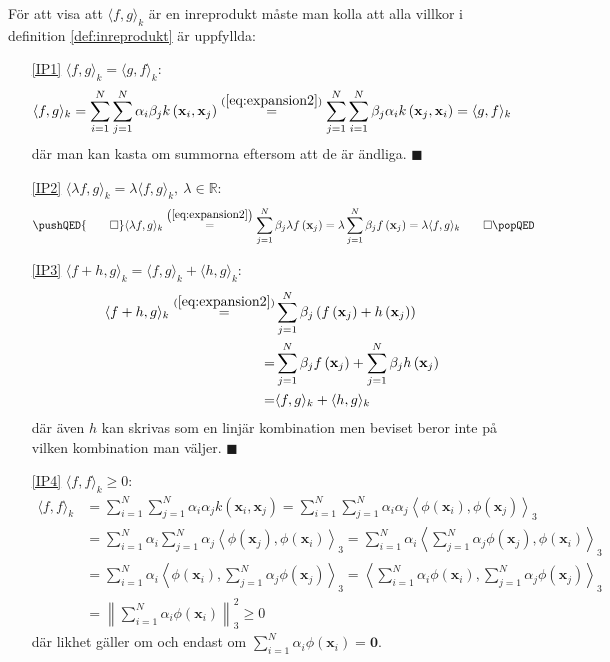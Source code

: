 \documentclass[a4paper, 12pt]{report}
\theoremstyle{definition}
\theoremstyle{remark}
\renewcommand\qedsymbol{$\blacksquare$}
\newcommand{\bfx}{\mathbf{x}}
\begin{document}
För att visa att $\langle f, g \rangle_k$ är en inreprodukt måste man kolla att alla villkor i definition \ref{def:inreprodukt} är uppfyllda:
\begin{enumerate}
	\item[\ref{IP1}] $\langle f, g \rangle_k=\langle g, f \rangle_k$:
	\begin{align*}
		\langle f, g \rangle_k = \sum_{i=1}^{N} \sum_{j=1}^{N} \alpha_i \beta_j k\left(\bfx_i, \bfx_j\right) \overset{(\ref{eq:expansion2})}{=} \sum_{j=1}^{N} \sum_{i=1}^{N}  \beta_j \alpha_i k\left(\bfx_j, \bfx_i\right) = \langle g, f \rangle_k
	\end{align*}
	där man kan kasta om summorna eftersom att de är ändliga. \hfill \qedsymbol
	\item[\ref{IP2}] $\langle \lambda f, g \rangle_k=\lambda\langle f, g \rangle_k,~\lambda\in\mathbb{R}$:
	\begin{equation*}
	\pushQED{\qed}
		\langle \lambda f, g \rangle_k	\overset{\left(\ref{eq:expansion2}\right)}{=} \sum_{j=1}^{N} \beta_j \lambda f\left(\bfx_j\right) = \lambda \sum_{j=1}^{N} \beta_j f\left(\bfx_j\right) = \lambda\langle f, g \rangle_k \qedhere
		\popQED
	\end{equation*}
	\item[\ref{IP3}] $\langle f+h, g\rangle_k = \langle f, g\rangle_k + \langle h, g\rangle_k$:
	\begin{align*}
		\langle f+h, g \rangle_k \overset{(\ref{eq:expansion2})}{=} &\sum_{j=1}^{N} \beta_j \left(f\left(\bfx_j\right) + h\left(\bfx_j\right)\right)\\
		= &\sum_{j=1}^{N} \beta_j f\left(\bfx_j\right) + \sum_{j=1}^{N} \beta_j h\left(\bfx_j\right)\\
		= &\langle f, g\rangle_k + \langle h, g\rangle_k
	\end{align*}
	där även $h$ kan skrivas som en linjär kombination men beviset beror inte på vilken kombination man väljer. \hfill \qedsymbol
	\item[\ref{IP4}] $\langle f, f \rangle_k\geq0$:
	\begin{align*}
	\langle f, f \rangle_k &= \sum_{i=1}^{N}\sum_{j=1}^{N}\alpha_i\alpha_jk\left(\bfx_i, \bfx_j\right)
	= \sum_{i=1}^{N}\sum_{j=1}^{N}\alpha_i\alpha_j\left\langle\phi\left(\bfx_i\right),\phi\left(\bfx_j\right)\right\rangle_3\\
	&= \sum_{i=1}^{N}\alpha_i\sum_{j=1}^{N}\alpha_j\left\langle\phi\left(\bfx_j\right),\phi\left(\bfx_i\right)\right\rangle_3
	= \sum_{i=1}^{N}\alpha_i\left\langle\sum_{j=1}^{N}\alpha_j\phi\left(\bfx_j\right),\phi\left(\bfx_i\right)\right\rangle_3\\
	&= \sum_{i=1}^{N}\alpha_i\left\langle\phi\left(\bfx_i\right),\sum_{j=1}^{N}\alpha_j\phi\left(\bfx_j\right)\right\rangle_3
	= \left\langle\sum_{i=1}^{N}\alpha_i\phi\left(\bfx_i\right),\sum_{j=1}^{N}\alpha_j\phi\left(\bfx_j\right)\right\rangle_3\\
	&= \left\|\sum_{i=1}^{N}\alpha_i\phi\left(\bfx_i\right)\right\|_3^2\geq 0
	\end{align*}
	där likhet gäller om och endast om $\sum_{i=1}^{N}\alpha_i\phi\left(\bfx_i\right)=\mathbf{0}$.
	

\end{enumerate}
\end{document}

